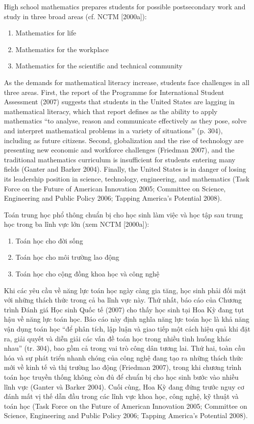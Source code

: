 \documentclass[
  10pt,
  a4paper,
  landscape,
  twoside,
  openany
]{scrbook}
\newcommand{\EN}[1]{#1}
\newcommand{\VI}[1]{#1}
\begin{document}
\TriPara
{
\EN{High school mathematics prepares students for possible postsecondary work and study in three broad areas (cf. NCTM [2000a]):
  \begin{enumerate}
    \item Mathematics for life
    \item Mathematics for the workplace
    \item Mathematics for the scientific and technical community
  \end{enumerate}    
As the demands for mathematical literacy increase, students face challenges in all three areas. First, the report of the Programme for International Student Assessment (2007) suggests that students in the United States are lagging in mathematical literacy, which that report defines as the ability to apply mathematics ``to analyse, reason and communicate effectively as they pose, solve and interpret mathematical problems in a variety of situations'' (p. 304), including as future citizens. Second, globalization and the rise of technology are presenting new economic and workforce challenges (Friedman 2007), and the traditional mathematics curriculum is insufficient for students entering many fields (Ganter and Barker 2004). Finally, the United States is in danger of losing its leadership position in science, technology, engineering, and mathematics (Task Force on the Future of American Innovation 2005; Committee on Science, Engineering and Public Policy 2006; Tapping America's Potential 2008).}
}
{
\VI{Toán trung học phổ thông chuẩn bị cho học sinh làm việc và học tập sau trung học trong ba lĩnh vực lớn (xem NCTM [2000a]):
  \begin{enumerate}
    \item Toán học cho đời sống
    \item Toán học cho môi trường lao động
    \item Toán học cho cộng đồng khoa học và công nghệ
  \end{enumerate}
Khi các yêu cầu về năng lực toán học ngày càng gia tăng, học sinh phải đối mặt với những thách thức trong cả ba lĩnh vực này. Thứ nhất, báo cáo của Chương trình Đánh giá Học sinh Quốc tế (2007) cho thấy học sinh tại Hoa Kỳ đang tụt hậu về năng lực toán học. Báo cáo này định nghĩa năng lực toán học là khả năng vận dụng toán học ``để phân tích, lập luận và giao tiếp một cách hiệu quả khi đặt ra, giải quyết và diễn giải các vấn đề toán học trong nhiều tình huống khác nhau'' (tr. 304), bao gồm cả trong vai trò công dân tương lai. Thứ hai, toàn cầu hóa và sự phát triển nhanh chóng của công nghệ đang tạo ra những thách thức mới về kinh tế và thị trường lao động (Friedman 2007), trong khi chương trình toán học truyền thống không còn đủ để chuẩn bị cho học sinh bước vào nhiều lĩnh vực (Ganter và Barker 2004). Cuối cùng, Hoa Kỳ đang đứng trước nguy cơ đánh mất vị thế dẫn đầu trong các lĩnh vực khoa học, công nghệ, kỹ thuật và toán học (Task Force on the Future of American Innovation 2005; Committee on Science, Engineering and Public Policy 2006; Tapping America's Potential 2008).}
}
\end{document}
